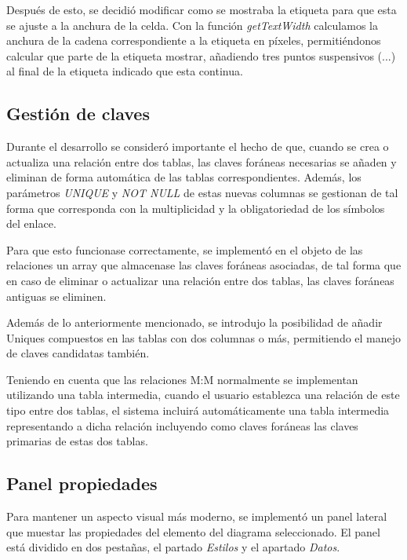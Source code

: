 Después de esto, se decidió modificar como se mostraba la etiqueta para que esta se ajuste a la anchura de la celda. Con la función \textit{getTextWidth} calculamos la anchura de la cadena correspondiente a la etiqueta en píxeles, permitiéndonos calcular que parte de la etiqueta mostrar, añadiendo tres puntos suspensivos (...) al final de la etiqueta indicado que esta continua.

\subsection{Gestión de claves}

Durante el desarrollo se consideró importante el hecho de que, cuando se crea o actualiza una relación entre dos tablas, las claves foráneas necesarias se añaden y eliminan de forma automática de las tablas correspondientes. Además, los parámetros \textit{UNIQUE} y \textit{NOT NULL} de estas nuevas columnas se gestionan de tal forma que corresponda con la multiplicidad y la obligatoriedad de los símbolos del enlace.

Para que esto funcionase correctamente, se implementó en el objeto de las relaciones un array que almacenase las claves foráneas asociadas, de tal forma que en caso de eliminar o actualizar una relación entre dos tablas, las claves foráneas antiguas se eliminen.

Además de lo anteriormente mencionado, se introdujo la posibilidad de añadir Uniques compuestos en las tablas con dos columnas o más, permitiendo el manejo de claves candidatas también.

Teniendo en cuenta que las relaciones M:M normalmente se implementan utilizando una tabla intermedia, cuando el usuario establezca una relación de este tipo entre dos tablas, el sistema incluirá automáticamente una tabla intermedia representando a dicha relación incluyendo como claves foráneas las claves primarias de estas dos tablas.

\subsection{Panel propiedades}

Para mantener un aspecto visual más moderno, se implementó un panel lateral que muestar las propiedades del elemento del diagrama seleccionado. El panel está dividido en dos pestañas, el partado \textit{Estilos} y el apartado \textit{Datos}.


